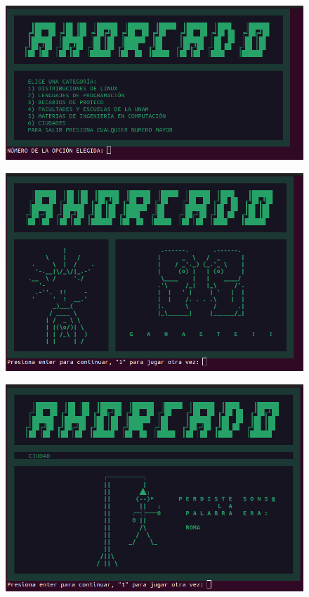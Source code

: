\documentclass[letter,12pt]{article} %
\begin{document}
\begin{figure}[H]
	\centering
	\includegraphics[scale=0.6]{imagenes/ahorcado.png}
\end{figure}
\begin{figure}[H]
	\centering
	\includegraphics[scale=0.6]{imagenes/ahorcado1.png}
\end{figure}
\begin{figure}[H]
	\centering
	\includegraphics[scale=0.6]{imagenes/ahorcado2.png}
\end{figure}
\end{document}
